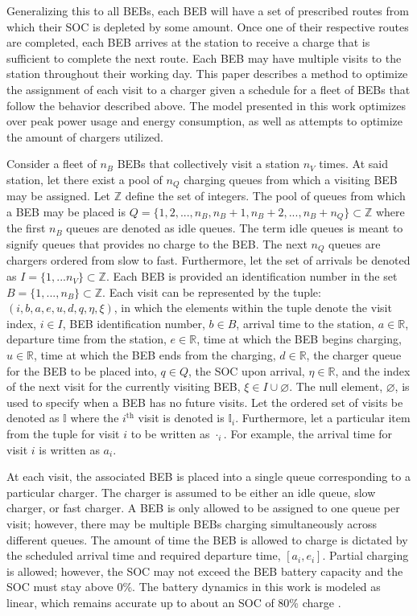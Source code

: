 \documentclass[11pt,a4paper,final]{article}
\newcommand{\visit}{(i, b, a, e, u, d, q, \eta, \xi)}
\newcommand{\I}{\mathbb{I}}                 %
\newcommand{\Iset}{I}                       %
\newcommand{\Qset}{Q}                       %
\begin{document}
Generalizing this to all BEBs, each BEB will have a set of prescribed routes from which their SOC is depleted by some
amount. Once one of their respective routes are completed, each BEB arrives at the station to receive a charge that is
sufficient to complete the next route. Each BEB may have multiple visits to the station throughout their working day.
This paper describes a method to optimize the assignment of each visit to a charger given a schedule for a fleet of BEBs
that follow the behavior described above. The model presented in this work optimizes over peak power usage and energy
consumption, as well as attempts to optimize the amount of chargers utilized.

Consider a fleet of \(n_B\) BEBs that collectively visit a station \(n_V\) times. At said station, let there exist a pool of
\(n_Q\) charging queues from which a visiting BEB may be assigned. Let \(\mathbb{Z}\) define the set of integers. The pool of queues
from which a BEB may be placed is \(\Qset = \{1, 2, ..., n_B, n_B+1, n_B+2, ..., n_B + n_Q\} \subset \mathbb{Z}\) where the first \(n_B\)
queues are denoted as idle queues. The term idle queues is meant to signify queues that provides no charge to the BEB.
The next \(n_Q\) queues are chargers ordered from slow to fast. Furthermore, let the set of arrivals be denoted as \(\Iset
= \{ 1, ... n_V \} \subset \mathbb{Z}\). Each BEB is provided an identification number in the set \(B = \{ 1, ..., n_B \} \subset \mathbb{Z}\). Each
visit can be represented by the tuple: \(\visit\), in which the elements within the tuple denote the visit index, \(i \in I\),
BEB identification number, \(b \in B\), arrival time to the station, \(a \in \mathbb{R}\), departure time from the station, \(e \in \mathbb{R}\), time
at which the BEB begins charging, \(u \in \mathbb{R}\), time at which the BEB ends from the charging, \(d \in \mathbb{R}\), the charger queue for
the BEB to be placed into, \(q \in Q\), the SOC upon arrival, \(\eta \in \mathbb{R}\), and the index of the next visit for the currently
visiting BEB, \(\xi \in I \cup \varnothing\). The null element, \(\varnothing\), is used to specify when a BEB has no future
visits. Let the ordered set of visits be denoted as \(\I\) where the \(i^{\text{th}}\) visit is denoted is \(\I_i\).
Furthermore, let a particular item from the tuple for visit \(i\) to be written as \(\cdot_i\). For example, the arrival time
for visit \(i\) is written as \(a_i\).

At each visit, the associated BEB is placed into a single queue corresponding to a particular charger. The charger is
assumed to be either an idle queue, slow charger, or fast charger. A BEB is only allowed to be assigned to one queue per
visit; however, there may be multiple BEBs charging simultaneously across different queues. The amount of time the BEB
is allowed to charge is dictated by the scheduled arrival time and required departure time, \([a_i, e_i]\). Partial
charging is allowed; however, the SOC may not exceed the BEB battery capacity and the SOC must stay above 0\%. The
battery dynamics in this work is modeled as linear, which remains accurate up to about an SOC of 80\% charge
\cite{li-2016-batter-elect}.
\end{document}
